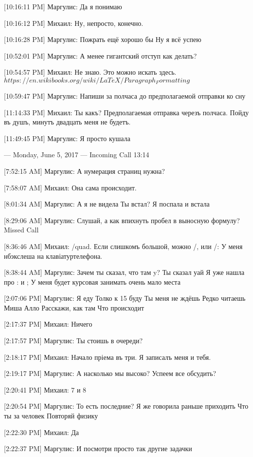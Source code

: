 \documentclass{article}
\newcommand{\yat}{{\fontencoding{X2}\selectfont\cyryat}} %
\begin{document}
[10:16:11 PM] Маргулис:
Да я понимаю

[10:16:12 PM] Михаил:
Ну, непросто, конечно.

[10:16:28 PM] Маргулис:
Пожрать ещё хорошо бы
 Ну я всё успею

[10:52:01 PM] Маргулис:
А менее гигантский отступ как делать?

[10:54:57 PM] Михаил:
Не знаю. Это можно искать здесь. $https://en.wikibooks.org/wiki/LaTeX/Paragraph_Formatting$

[10:59:47 PM] Маргулис:
Напиши за полчаса до предполагаемой отправки ко сну

[11:14:33 PM] Михаил:
Ты какъ? Предполагаемая отправка черезъ полчаса.
 Пойду въ душъ, минутъ двадцать меня не будетъ.

[11:49:45 PM] Маргулис:
Я просто кушала

--- Monday, June 5, 2017 ---
Incoming Call 13:14

[7:52:15 AM] Маргулис:
А нумерация страниц нужна?

[7:58:07 AM] Михаил:
Она сама происходит.

[8:01:34 AM] Маргулис:
А я не видела
 Ты встал?
 Я поспала и встала

[8:29:06 AM] Маргулис:
Слушай, а как впихнуть пробел в выносную формулу?
Missed Call

[8:36:46 AM] Михаил:
/quad. Если слишкомъ большой, можно /, или /:
 У меня н бэкслеша на клавіатур\yat телефона.

[8:38:44 AM] Маргулис:
Зачем ты сказал, что там y?
 Ты сказал уай
 Я уже нашла про : и ;
 У меня будет курсовая занимать очень мало места

[2:07:06 PM] Маргулис:
Я еду
 Толко к 15 буду
 Ты меня не ждёшь
 Редко читаешь
 Миша
 Алло
 Расскажи, как там
 Что происходит

[2:17:37 PM] Михаил:
Ничего

[2:17:57 PM] Маргулис:
Ты стоишь в очереди?

[2:18:17 PM] Михаил:
Начало пріема въ три. Я записалъ меня и тебя.

[2:19:17 PM] Маргулис:
А насколько мы высоко?
 Успеем все обсудить?

[2:20:41 PM] Михаил:
7 и 8

[2:20:54 PM] Маргулис:
То есть последние?
 Я же говорила раньше приходить
 Что ты за человек
 Повторяй физику

[2:22:30 PM] Михаил:
Да

[2:22:37 PM] Маргулис:
И посмотри просто так другие задачки
\end{document}
